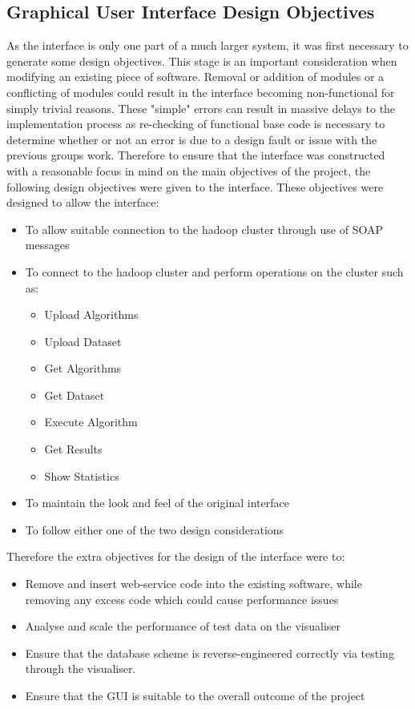 \subsection{Graphical User Interface Design Objectives}
As the interface is only one part of a much larger system, it was first necessary to generate some design objectives. This stage is an important consideration when modifying an existing piece of software. Removal or addition of modules or a conflicting of modules could result in the interface becoming non-functional for simply trivial reasons. These "simple" errors can result in massive delays to the implementation process as re-checking of functional base code is necessary to determine whether or not an error is due to a design fault or issue with the previous groups work. Therefore to ensure that the interface was constructed with a reasonable focus in mind on the main objectives of the project, the following design objectives were given to the interface. These objectives were designed to allow the interface: 

\begin{itemize}
	\item To allow suitable connection to the hadoop cluster through use of SOAP messages
	
	\item To connect to the hadoop cluster and perform operations on the cluster such as:
	\begin{itemize}
		\item Upload Algorithms
		\item Upload Dataset
		\item Get Algorithms
		\item Get Dataset
		\item Execute Algorithm
		\item Get Results
		\item Show Statistics
	\end{itemize}
	
	\item To maintain the look and feel of the original interface
	
	\item To follow either one of the two design considerations
\end{itemize}

Therefore the extra objectives for the design of the interface were to:
\begin{itemize}
	\item Remove and insert web-service code into the existing software, while removing any excess code which could cause performance issues
	
	\item Analyse and scale the performance of test data on the visualiser
	
	\item Ensure that the database scheme is reverse-engineered correctly via testing through the visualiser.
	
	\item Ensure that the GUI is suitable to the overall outcome of the project
\end{itemize}

